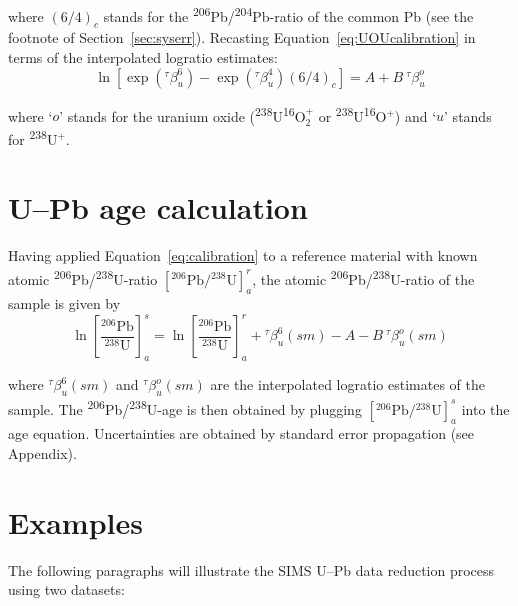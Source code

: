\documentclass{article}
\begin{document}
\begin{enumerate}
\noindent where $(6/4)_c$ stands for the
\textsuperscript{206}Pb/\textsuperscript{204}Pb-ratio of the common Pb
(see the footnote of Section~\ref{sec:syserr}). Recasting
Equation~\ref{eq:UOUcalibration} in terms of the interpolated logratio
estimates:
\begin{equation}
  \ln\!\left[\exp({}^{\tau}\!\beta^6_u) -
    \exp({}^{\tau}\!\beta^4_u)(6/4)_c \right] = A + B ~ {}^{\tau}\!\beta^o_u
  \label{eq:calibration}
\end{equation}

\noindent where `$o$' stands for the uranium oxide
(\textsuperscript{238}U\textsuperscript{16}O$^{+}_{2}$ or
\textsuperscript{238}U\textsuperscript{16}O$^+$) and `$u$' stands for
\textsuperscript{238}U$^+$.

\end{enumerate}

\section{U--Pb age calculation}
\label{sec:calibrate}

Having applied Equation~\ref{eq:calibration} to a reference material
with known atomic \textsuperscript{206}Pb/\textsuperscript{238}U-ratio
$\left[{}^{206}\mbox{Pb}/{}^{238}\mbox{U}\right]^{\!r}_{\!a}$, the
atomic \textsuperscript{206}Pb/\textsuperscript{238}U-ratio of the
sample is given by
\begin{equation}
  \ln\!\left[\frac{{}^{206}\mbox{Pb}}{{}^{238}\mbox{U}}\right]^{\!s}_{\!a} =
  \ln\!\left[\frac{{}^{206}\mbox{Pb}}{{}^{238}\mbox{U}}\right]^{\!r}_{\!a} +
  {}^{\tau}\!\beta^6_u(sm) - A - B ~ {}^{\tau}\!\beta^o_u(sm)
  \label{eq:calibrate}
\end{equation}

\noindent where ${}^{\tau}\!\beta^6_u(sm)$ and
${}^{\tau}\!\beta^o_u(sm)$ are the interpolated logratio estimates of
the sample.  The \textsuperscript{206}Pb/\textsuperscript{238}U-age is
then obtained by plugging
$\left[{}^{206}\mbox{Pb}/{}^{238}\mbox{U}\right]^{\!s}_{\!a}$ into the age
equation. Uncertainties are obtained by standard error propagation
(see Appendix).

\section{Examples}\label{sec:examples}

The following paragraphs will illustrate the SIMS U--Pb data reduction
process using two datasets:
\end{document}
